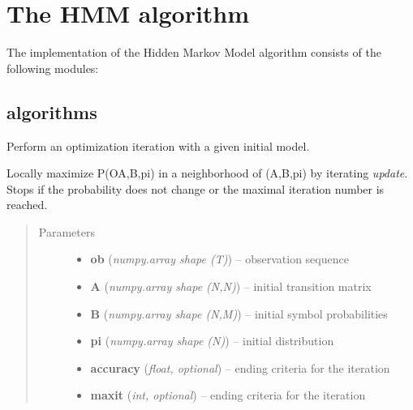 \documentclass[letterpaper,10pt,english]{sphinxmanual}
\begin{document}
\chapter{The HMM algorithm}
\label{hmm:the-hmm-algorithm}\label{hmm::doc}
The implementation of the Hidden Markov Model algorithm consists of the following modules:


\section{algorithms}
\label{hmm:algorithms}\label{hmm:module-algorithms}

\begin{fulllineitems}
\label{hmm:algorithms.baum_welch}
Perform an optimization iteration with a given initial model.

Locally maximize P(O\textbar{}A,B,pi) in a neighborhood of (A,B,pi) by iterating
\emph{update}. Stops if the probability does not change or the maximal
iteration number is reached.
\begin{quote}\begin{description}
\item[{Parameters}] \leavevmode\begin{itemize}
\item {} 
\textbf{ob} (\emph{numpy.array shape (T)}) --
observation sequence

\item {} 
\textbf{A} (\emph{numpy.array shape (N,N)}) --
initial transition matrix

\item {} 
\textbf{B} (\emph{numpy.array shape (N,M)}) --
initial symbol probabilities

\item {} 
\textbf{pi} (\emph{numpy.array shape (N)}) --
initial distribution

\item {} 
\textbf{accuracy} (\emph{float, optional}) --
ending criteria for the iteration

\item {} 
\textbf{maxit} (\emph{int, optional}) --
ending criteria for the iteration


\end{itemize}
\end{description}
\end{quote}
\end{fulllineitems}
\end{document}
